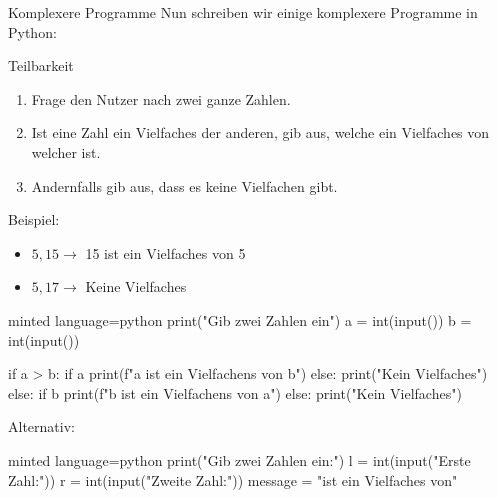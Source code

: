 \begin{task}{Komplexere Programme}
    Nun schreiben wir einige komplexere Programme in Python:

    \begin{subtask*}{Teilbarkeit}
        \begin{enumerate}
            \item Frage den Nutzer nach zwei ganze Zahlen.
            \item Ist eine Zahl ein Vielfaches der anderen, gib aus,
                welche ein Vielfaches von welcher ist.
            \item Andernfalls gib aus, dass es keine Vielfachen gibt.
        \end{enumerate}

        Beispiel:
        \begin{itemize}
            \item $5, 15 \to$ 15 ist ein Vielfaches von 5
            \item $5, 17 \to$ Keine Vielfaches
        \end{itemize}

        \begin{hinweise}
        \end{hinweise}

        \begin{solution}
            \begin{codeBlock}[]{minted language=python}
                print("Gib zwei Zahlen ein")
                a = int(input())
                b = int(input())

                if a > b:
                    if a %
                        print(f"{a} ist ein Vielfachens von {b}")
                    else:
                        print("Kein Vielfaches")
                else:
                    if b %
                        print(f"{b} ist ein Vielfachens von {a}")
                    else:
                        print("Kein Vielfaches")
            \end{codeBlock}

            Alternativ:
            \begin{codeBlock}[]{minted language=python}
                print("Gib zwei Zahlen ein:")
                l = int(input("Erste Zahl:"))
                r = int(input("Zweite Zahl:"))
                message = "ist ein Vielfaches von"


\end{codeBlock}
\end{solution}
\end{subtask*}
\end{task}
